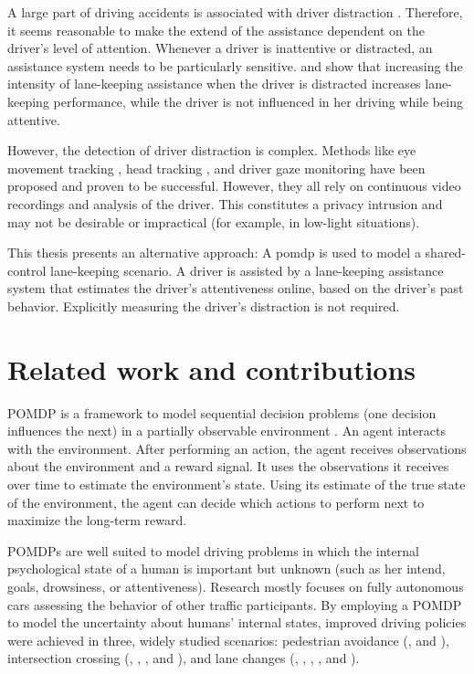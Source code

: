A large part of driving accidents is associated with driver distraction \parencite{distracted_nhtsa}. Therefore, it seems reasonable to make the extend of the assistance dependent on the driver's level of attention. Whenever a driver is inattentive or distracted, an assistance system needs to be particularly sensitive. \cite{disracted-lane-keeping-1} and \cite{disracted-lane-keeping-2} show that increasing the intensity of lane-keeping assistance when the driver is distracted increases lane-keeping performance, while the driver is not influenced in her driving while being attentive. 

However, the detection of driver distraction is complex. Methods like eye movement tracking \parencite{eye-movement}, head tracking \parencite{head-tracking}, and driver gaze monitoring \parencite{gaze-monitoring} have been proposed and proven to be successful. However, they all rely on continuous video recordings and analysis of the driver. This constitutes a privacy intrusion and may not be desirable or impractical (for example, in low-light situations). 

This thesis presents an alternative approach: A \Gls{pomdp} is used to model a shared-control lane-keeping scenario. A driver is assisted by a lane-keeping assistance system that estimates the driver's attentiveness online, based on the driver's past behavior. Explicitly measuring the driver's distraction is not required.

\section{Related work and contributions}

POMDP is a framework to model sequential decision problems (one decision influences the next) in a partially observable environment \parencite{pomdp-definition}. An agent interacts with the environment. After performing an action, the agent receives observations about the environment and a reward signal. It uses the observations it receives over time to estimate the environment's state. Using its estimate of the true state of the environment, the agent can decide which actions to perform next to maximize the long-term reward.

POMDPs are well suited to model driving problems in which the internal psychological state of a human is important but unknown (such as her intend, goals, drowsiness, or attentiveness). Research mostly focuses on fully autonomous cars assessing the behavior of other traffic participants. By employing a POMDP to model the uncertainty about humans' internal states, improved driving policies were achieved in three, widely studied scenarios: pedestrian avoidance (\cite{despot-crowd}, and \cite{pomdp-pedestrian-avoid-2}), intersection crossing (\cite{pomdp-intersection}, \cite{att_intersec}, \cite{pomdp-intersection-2}, and \cite{pomdp-intersection-3}), and lane changes (\cite{pomdp-lane-changes}, \cite{att_intersec}, \cite{pomdp-lane-changes-2}, \cite{tactical-decision}, and \cite{pomdp_towards_human}). 

